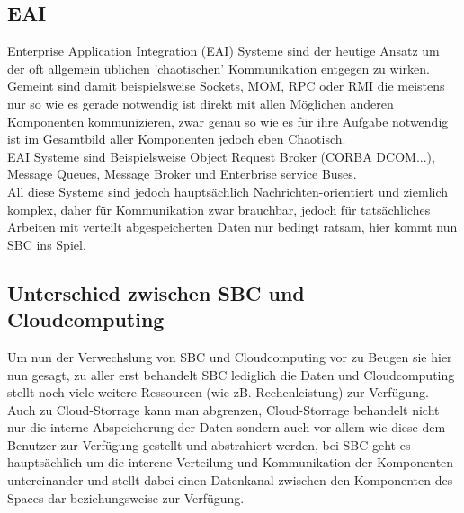 \documentclass[a4paper,12pt]{scrreprt}
\begin{document}
		\subsection{EAI}
			Enterprise Application Integration (EAI) Systeme sind der heutige Ansatz um der oft allgemein üblichen 'chaotischen' Kommunikation entgegen zu wirken. Gemeint sind damit beispielsweise Sockets, MOM, RPC oder RMI die meistens nur so wie es gerade notwendig ist direkt mit allen Möglichen anderen Komponenten kommunizieren, zwar genau so wie es für ihre Aufgabe notwendig ist im Gesamtbild aller Komponenten jedoch eben Chaotisch. \\
			EAI Systeme sind Beispielsweise Object Request Broker (CORBA DCOM...), Message Queues, Message Broker und Enterbrise service Buses.\\
			All diese Systeme sind jedoch hauptsächlich Nachrichten-orientiert und ziemlich komplex, daher für Kommunikation zwar brauchbar, jedoch für tatsächliches Arbeiten mit verteilt abgespeicherten Daten nur bedingt ratsam, hier kommt nun SBC ins Spiel.
		
		\subsection{Unterschied zwischen SBC und Cloudcomputing}
			Um nun der Verwechslung von SBC und Cloudcomputing vor zu Beugen sie hier nun gesagt, zu aller erst behandelt SBC lediglich die Daten und Cloudcomputing stellt noch viele weitere Ressourcen (wie zB. Rechenleistung) zur Verfügung. Auch zu Cloud-Storrage kann man abgrenzen, Cloud-Storrage behandelt nicht nur die interne Abspeicherung der Daten sondern auch vor allem wie diese dem Benutzer zur Verfügung gestellt und abstrahiert werden, bei SBC geht es hauptsächlich um die interene Verteilung und Kommunikation der Komponenten untereinander und stellt dabei einen Datenkanal zwischen den Komponenten des Spaces dar beziehungsweise zur Verfügung. 
			
\end{document}
